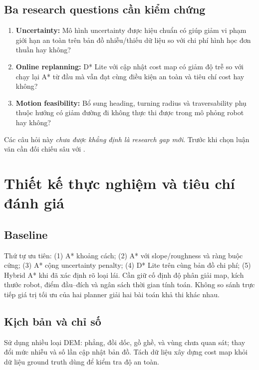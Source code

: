 \documentclass[11pt,a4paper]{article}
\begin{document}
\subsection{Ba research questions cần kiểm chứng}
\begin{enumerate}[label=\textbf{RQ\arabic*.}]
\item \textbf{Uncertainty:} Mô hình uncertainty được hiệu chuẩn
có giúp giảm vi phạm giới hạn an toàn trên bản đồ nhiễu/thiếu dữ liệu
so với chi phí hình học đơn thuần hay không?
\item \textbf{Online replanning:} D* Lite với cập nhật cost map
có giảm độ trễ so với chạy lại A* từ đầu mà vẫn đạt cùng điều kiện
an toàn và tiêu chí cost hay không?
\item \textbf{Motion feasibility:} Bổ sung heading, turning radius
và traversability phụ thuộc hướng có giảm đường đi không thực thi được
trong mô phỏng robot hay không?
\end{enumerate}
Các câu hỏi này \emph{chưa được khẳng định là research gap mới}.
Trước khi chọn luận văn cần đối chiếu sâu với
\cite{lee2023uncertainty,wang2024history,feng2025constraint,gai2026framework,wang2026winter}.

\section{Thiết kế thực nghiệm và tiêu chí đánh giá}
\subsection{Baseline}
Thứ tự ưu tiên: (1) A* khoảng cách; (2) A* với slope/roughness
và ràng buộc cứng; (3) A* cộng uncertainty penalty;
(4) D* Lite trên cùng bản đồ chi phí;
(5) Hybrid A* khi đã xác định rõ loại lái.
Cần giữ cố định độ phân giải map, kích thước robot,
điểm đầu--đích và ngân sách thời gian tính toán.
Không so sánh trực tiếp giá trị tối ưu của hai planner
giải hai bài toán khả thi khác nhau.

\subsection{Kịch bản và chỉ số}
Sử dụng nhiều loại DEM: phẳng, đồi dốc, gồ ghề,
và vùng chưa quan sát; thay đổi mức nhiễu và số lần cập nhật bản đồ.
Tách dữ liệu xây dựng cost map khỏi dữ liệu ground truth dùng
để kiểm tra độ an toàn.
\end{document}
